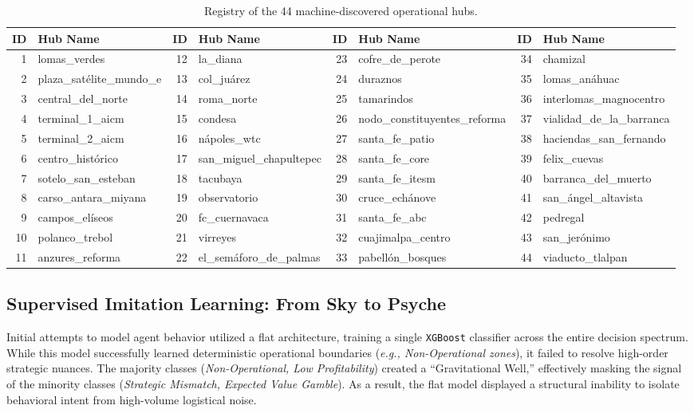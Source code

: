 \documentclass[10pt, letterpaper]{article}
\begin{document}
\begin{table}[H]
    \centering
    \scriptsize
    \setlength{\tabcolsep}{4pt}
    \begin{tabular}{rl | rl | rl | rl}
        \toprule
        \textbf{ID} & \textbf{Hub Name} & \textbf{ID} & \textbf{Hub Name} & \textbf{ID} & \textbf{Hub Name} & \textbf{ID} & \textbf{Hub Name} \\
        \midrule
        1 & lomas\_verdes & 12 & la\_diana & 23 & cofre\_de\_perote & 34 & chamizal \\
        2 & plaza\_satélite\_mundo\_e & 13 & col\_juárez & 24 & duraznos & 35 & lomas\_anáhuac \\
        3 & central\_del\_norte & 14 & roma\_norte & 25 & tamarindos & 36 & interlomas\_magnocentro \\
        4 & terminal\_1\_aicm & 15 & condesa & 26 & nodo\_constituyentes\_reforma & 37 & vialidad\_de\_la\_barranca \\
        5 & terminal\_2\_aicm & 16 & nápoles\_wtc & 27 & santa\_fe\_patio & 38 & haciendas\_san\_fernando \\
        6 & centro\_histórico & 17 & san\_miguel\_chapultepec & 28 & santa\_fe\_core & 39 & felix\_cuevas \\
        7 & sotelo\_san\_esteban & 18 & tacubaya & 29 & santa\_fe\_itesm & 40 & barranca\_del\_muerto \\
        8 & carso\_antara\_miyana & 19 & observatorio & 30 & cruce\_echánove & 41 & san\_ángel\_altavista \\
        9 & campos\_elíseos & 20 & fc\_cuernavaca & 31 & santa\_fe\_abc & 42 & pedregal \\
        10 & polanco\_trebol & 21 & virreyes & 32 & cuajimalpa\_centro & 43 & san\_jerónimo \\
        11 & anzures\_reforma & 22 & el\_semáforo\_de\_palmas & 33 & pabellón\_bosques & 44 & viaducto\_tlalpan \\
        \bottomrule
    \end{tabular}
    \caption{Registry of the 44 machine-discovered operational hubs.}
    \label{tab:hdbscan_dictionary}
\end{table}



\subsection{Supervised Imitation Learning: From Sky to Psyche}

Initial attempts to model agent behavior utilized a flat architecture, training a single \texttt{XGBoost} classifier across the entire decision spectrum. While this model successfully learned deterministic operational boundaries (\textit{e.g., Non-Operational zones}), it failed to resolve high-order strategic nuances. The majority classes (\textit{Non-Operational, Low Profitability}) created a ``Gravitational Well,'' effectively masking the signal of the minority classes (\textit{Strategic Mismatch, Expected Value Gamble}). As a result, the flat model displayed a structural inability to isolate behavioral intent from high-volume logistical noise.
\end{document}
